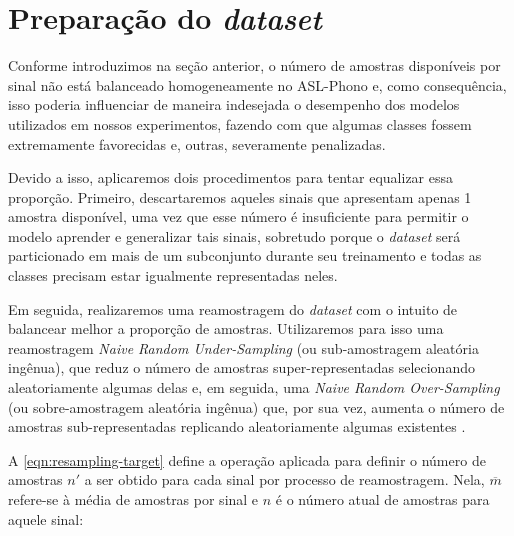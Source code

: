 \section{Preparação do \textit{dataset}}
\label{sec:metodologia-preparacao-dataset}


Conforme introduzimos na seção anterior, o número de amostras disponíveis por sinal não está balanceado homogeneamente no ASL-Phono e, como consequência, isso poderia influenciar de maneira indesejada o desempenho dos modelos utilizados em nossos experimentos, fazendo com que algumas classes fossem extremamente favorecidas e, outras, severamente penalizadas.


Devido a isso, aplicaremos dois procedimentos para tentar equalizar essa proporção. Primeiro, descartaremos aqueles sinais que apresentam apenas 1 amostra disponível, uma vez que esse número é insuficiente para permitir o modelo aprender e generalizar tais sinais, sobretudo porque o \textit{dataset} será particionado em mais de um subconjunto durante seu treinamento e todas as classes precisam estar igualmente representadas neles.

Em seguida, realizaremos uma reamostragem do \textit{dataset} com o intuito de balancear melhor a proporção de amostras.
Utilizaremos para isso uma reamostragem \textit{Naive Random Under-Sampling} (ou sub-amostragem aleatória ingênua), que reduz o número de amostras super-representadas selecionando aleatoriamente algumas delas e, em seguida, uma \textit{Naive Random Over-Sampling} (ou sobre-amostragem aleatória ingênua) que, por sua vez, aumenta o número de amostras sub-representadas replicando aleatoriamente algumas existentes \cite{he-2013-imbalanced}.

A \autoref{eqn:resampling-target} define a operação aplicada para definir o número de amostras \(n'\) a ser obtido para cada sinal por processo de reamostragem. Nela, \(\overline{m}\) refere-se à média de amostras por sinal e \(n\) é o número atual de amostras para aquele sinal:

